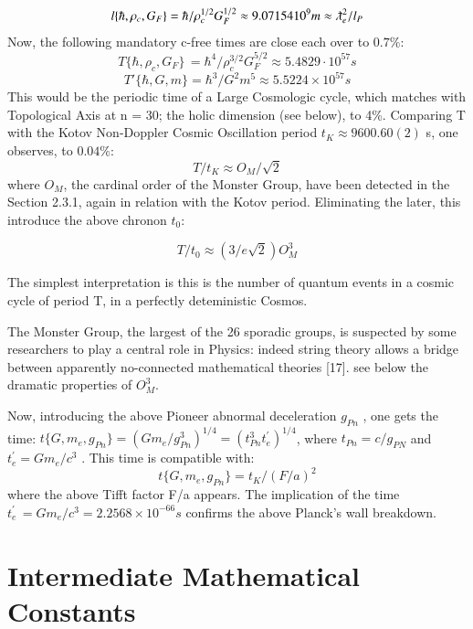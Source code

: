 \documentclass[twoside,draft]{article}
\begin{document}
\begin{sloppypar}
{$$l\{\hbar,\rho_{c},G_{F}\} = \hbar/\rho_{c}^{1/2} G_{F}^{1/2} \approx 9.07154 10^{9} m \approx \lambdabar_{e}^{2}/l_{P}$$
Now, the following mandatory c-free times are close each over to $0.7\%$:
\begin{equation}
T\{\hbar,\rho_{c} ,G_{F} \}\, = \hbar^{4} /\rho_{c}^{3/2} G_{F}^{5/2} \approx 5.4829 \cdot 10^{57} s
\end{equation}
$$T\prime\{\hbar,G,m\} = \hbar^{3} /G^{2} m^{5} \approx 5.5224 \times 10^{57} s$$
This would be the periodic time of a Large Cosmologic cycle, which matches with Topological Axis at n = 30;
the holic dimension (see below), to 4\%. Comparing T with the Kotov Non-Doppler Cosmic
Oscillation period $t_{K} \approx 9600.60(2)$ s, one observes, to $0.04\%$:
$$T/t_{K} \approx O_{M} /\sqrt{2}$$
where $O_{M}$, the cardinal order of the Monster Group, have been detected in the Section 2.3.1, again in relation with the Kotov period. Eliminating the later, this introduce the above chronon $t_0$:

\begin{equation}
T/t_0 \approx (3/e\sqrt{2})O_M^3
\end{equation}

The simplest interpretation is this is the number of quantum events in a cosmic cycle of period T, in a perfectly deteministic Cosmos. 

The  Monster  Group,  the largest of the 26 sporadic groups, is suspected by some researchers to play a central role in Physics: indeed string theory allows a bridge between apparently no-connected mathematical theories [17]. see below the dramatic properties of $O_M^3$.

Now, introducing the above Pioneer abnormal deceleration $g_{Pn}$ , one gets the time: 
$
t\{G, m_{e} , g_{Pn} \} = (Gm_{e} /g_{Pn}^{3} )^{1/4} = (t_{Pn}^{3} t^{\prime}_{e} )^{1/4}
$, where $t_{Pn} = c/g_{PN}$ and $t^{\prime}_{e} = Gm_{e} /c^{3}$ . This time is compatible with:
\begin{equation}
t\{G, m_{e} , g_{Pn} \} = t_{K} /(F/a)^{2}
\end{equation}
where the above Tifft factor F/a appears. The implication of the time 
$t^{\prime}_{e}\, = Gm_{e} /c^{3} = 2.2568 \times 10^{-66} s$
confirms the above Planck's wall breakdown.

\section{Intermediate Mathematical Constants}
}
\end{sloppypar}
\end{document}
